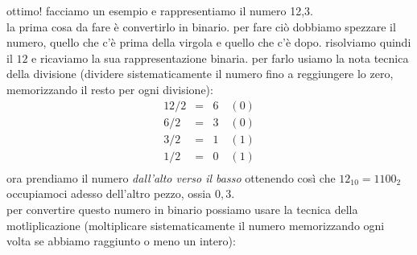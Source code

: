\documentclass{article}
\begin{document}
ottimo! facciamo un esempio e rappresentiamo il numero 12,3. \\ 
la prima cosa da fare è convertirlo in binario. 
per fare ciò dobbiamo spezzare il numero, quello che c'è prima della virgola e quello che c'è dopo. 
risolviamo quindi il $12$ e ricaviamo la sua rappresentazione binaria. per farlo usiamo la nota tecnica della divisione (dividere sistematicamente il numero fino a reggiungere lo zero, memorizzando il resto per ogni divisione): 
\begin{equation}
  \begin{array}{rcl}
  12 / 2 & = & 6 \quad (0) \\  
  6 / 2 & = & 3 \quad(0) \\  
  3 / 2 & = & 1\quad (1) \\  
  1 / 2 & = & 0\quad (1) \\  
  \end{array}
  \label{eq:conversione decimale binario 1 }
\end{equation}
ora prendiamo il numero \textit{dall'alto verso il basso} ottenendo così che $12_{10} = 1100_{2}$ \\ 
occupiamoci adesso dell'altro pezzo, ossia $0,3$. \\ 
per convertire questo numero in binario possiamo usare la tecnica della motliplicazione (moltiplicare sistematicamente il numero memorizzando ogni volta se abbiamo raggiunto o meno un intero): 
\end{document}
